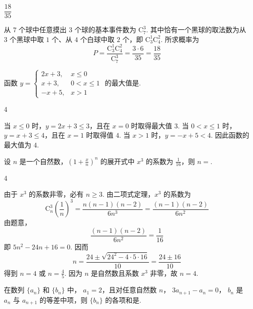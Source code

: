 \begin{answer}
\(\dfrac{18}{35}\)
\end{answer}

\begin{solution}
从 \(7\) 个球中任意摸出 \(3\) 个球的基本事件数为 \(\mathrm C_7^3\). 其中恰有一个黑球的取法数为从 \(3\) 个黑球中取 \(1\) 个、从 \(4\) 个白球中取 \(2\) 个，即 \(\mathrm C_3^1\mathrm C_4^2\). 所求概率为
\[
P=\frac{\mathrm C_3^1\mathrm C_4^2}{\mathrm C_7^3}=\frac{3\cdot6}{35}=\frac{18}{35}
\]
\end{solution}

\begin{problem}
函数 \(y=\begin{cases}
2x+3,&x\leqslant0\\
x+3,&0<x\leqslant1\\
-x+5,&x>1
\end{cases}\) 的最大值是\fillinblank{}.
\end{problem}

\begin{answer}
4
\end{answer}

\begin{solution}
当 \(x\leqslant0\) 时，\(y=2x+3\leqslant3\)，且在 \(x=0\) 时取得最大值 \(3\). 当 \(0<x\leqslant1\) 时，\(y=x+3\leqslant4\)，且在 \(x=1\) 时取得值 \(4\). 当 \(x>1\) 时，\(y=-x+5<4\). 因此函数的最大值为 \(4\).
\end{solution}

\begin{problem}
设 \(n\) 是一个自然数，\(\left(1+\frac{x}{n}\right)^{n} \) 的展开式中 \(x^{3} \) 的系数为 \(\frac{1}{16} \)，则 \(n=\)\fillinblank{}.
\end{problem}

\begin{answer}
4
\end{answer}

\begin{solution}
由于 \(x^3\) 的系数非零，必有 \(n\geqslant3\). 由二项式定理，\(x^3\) 的系数为
\[
\mathrm C_n^3\left(\frac1n\right)^3=\frac{n(n-1)(n-2)}{6n^3}=\frac{(n-1)(n-2)}{6n^2}
\]
由题意，
\[
\frac{(n-1)(n-2)}{6n^2}=\frac1{16}
\]
即 \(5n^2-24n+16=0\). 因而
\[
n=\frac{24\pm\sqrt{24^2-4\cdot5\cdot16}}{10}=\frac{24\pm16}{10}
\]
得到 \(n=4\) 或 \(n=\frac45\). 因为 \(n\) 是自然数且系数 \(x^3\) 非零，故 \(n=4\).
\end{solution}

\begin{problem}
在数列 \(\{a_{n}\} \) 和 \(\{b_{n}\} \) 中， \(a_{1}=2 \)，且对任意自然数 \(n\)， \(3a_{n+1}-a_{n}=0 \)， \(b_{n} \) 是 \(a_{n} \) 与 \(a_{n+1} \) 的等差中项，则 \(\{b_{n}\} \) 的各项和是\fillinblank{}.
\end{problem}

